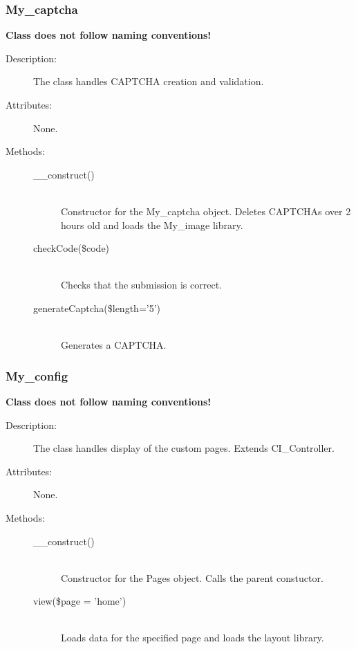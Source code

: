 \documentclass[11pt]{article} %
\begin{document}
\subsubsection{My\_captcha}
\textbf{Class does not follow naming conventions!}\\
\begin{description}
\item[Description:] The class handles CAPTCHA creation and validation.
\item[Attributes:] None.
\item[Methods:] \textbf{ }
\begin{description}
\item[\_\_construct()]  \textbf{ }\\
Constructor for the My\_captcha object. Deletes CAPTCHAs over 2 hours old and loads the My\_image library.
\item[checkCode(\$code)]  \textbf{ }\\
Checks that the submission is correct.
\item[generateCaptcha(\$length='5')]  \textbf{ }\\
Generates a CAPTCHA.
\end{description} 
\end{description} 

\subsubsection{My\_config}
\textbf{Class does not follow naming conventions!}\\
\begin{description}
\item[Description:] The class handles display of the custom pages. Extends CI\_Controller.
\item[Attributes:] None.
\item[Methods:] \textbf{ }
\begin{description}
\item[\_\_construct()]  \textbf{ }\\
Constructor for the Pages object. Calls the parent constuctor.
\item[view(\$page = 'home')]  \textbf{ }\\
Loads data for the specified page and loads the layout library.
\end{description} 
\end{description} 
\end{document}
